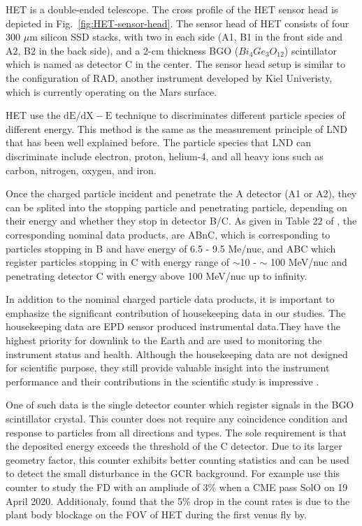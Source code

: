 \ac{HET} is a double-ended telescope. The cross profile of the \ac{HET} sensor head is depicted in Fig.~\ref{fig:HET-sensor-head}. The sensor head of \ac{HET} consists of four 300 $\mu$m silicon \ac{SSD} stacks, with two in each side (A1, B1 in the front side and A2, B2 in the back side), and a 2-cm thickness \ac{BGO} ($Bi_{4}Ge_{3}O_{12}$) scintillator which is named as detector C in the center. The sensor head setup is similar to the configuration of \ac{RAD}, another instrument developed by Kiel Univeristy, which is currently operating on the Mars surface.  

HET use the $\mathrm{dE/dX - E}$ technique to discriminates different particle species of different energy. This method is the same as the measurement principle of \ac{LND} that has been well explained before. The particle species that \ac{LND} can discriminate include electron, proton, helium-4, and all heavy ions such as carbon, nitrogen, oxygen, and iron.  

Once the charged particle incident and penetrate the A detector (A1 or A2), they can be splited into the stopping particle and penetrating particle, depending on their energy and whether they stop in detector B/C. As given in Table 22 of \citet{RodriguezPacheco-2019-EPD}, the corresponding nominal data products, are ABnC, which is corresponding to particles stopping in B and have energy of 6.5 - 9.5 Me/nuc, and ABC which register particles stopping in C with energy range of $\sim$10 - $\sim$ 100 MeV/nuc and penetrating detector C with energy above 100 MeV/nuc up to infinity. 



In addition to the nominal charged particle data products, it is important to emphasize the significant contribution of housekeeping data in our studies.
The housekeeping data are \ac{EPD} sensor produced instrumental data.They have the highest priority for downlink to the Earth and are used to monitoring the instrument status and health. Although the housekeeping data are not designed for scientific purpose, they still provide valuable insight into the instrument performance and their contributions in the scientific study is impressive \citep{Wimmer2021AA}.


One of such data is the single detector counter which register signals in the \ac{BGO} scintillator crystal. This counter does not require any coincidence condition and response to particles from all directions and types. The sole requirement is that the deposited energy exceeds the threshold of the C detector. Due to its larger geometry factor, this counter exhibits better counting statistics and can be used to detect the small disturbance in the \ac{GCR} background. For example \citep{Forstner-2021-SolO} use this counter to study the \ac{FD} with an ampliude of 3\% when a \ac{CME} pass \ac{SolO} on 19 April 2020. Additionaly, \citep{Allen2021AA_venus} found that the 5\% drop in the count rates is due to the plant body blockage on the \ac{FOV} of \ac{HET} during the first venus fly by.

